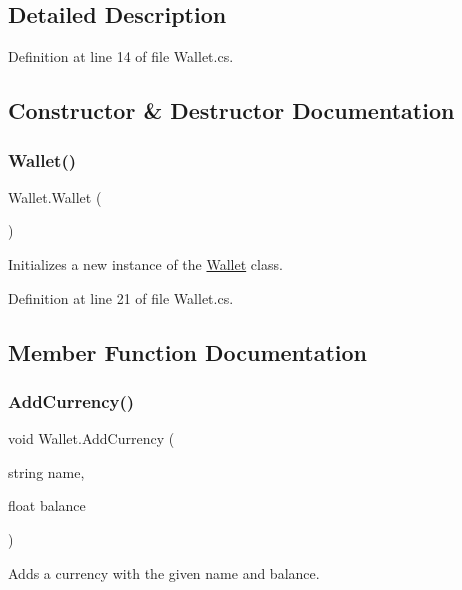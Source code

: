 \subsection{Detailed Description}


Definition at line 14 of file Wallet.\+cs.



\subsection{Constructor \& Destructor Documentation}
\mbox{\label{class_wallet_ac9a00180a49eb21e07c8fff305604a67}} 
\subsubsection{\texorpdfstring{Wallet()}{Wallet()}}
{\footnotesize\ttfamily Wallet.\+Wallet (\begin{DoxyParamCaption}{ }\end{DoxyParamCaption})}



Initializes a new instance of the \hyperlink{class_wallet}{Wallet} class. 



Definition at line 21 of file Wallet.\+cs.



\subsection{Member Function Documentation}
\mbox{\label{class_wallet_ac0d658fdcc4062427fd1eaf828b00472}} 
\subsubsection{\texorpdfstring{Add\+Currency()}{AddCurrency()}}
{\footnotesize\ttfamily void Wallet.\+Add\+Currency (\begin{DoxyParamCaption}\item[{string}]{name,  }\item[{float}]{balance }\end{DoxyParamCaption})}



Adds a currency with the given name and balance. 


